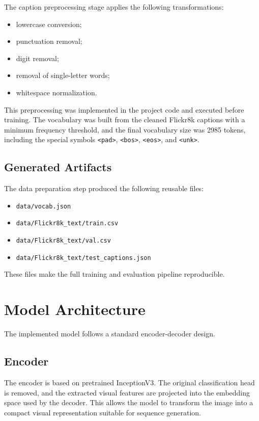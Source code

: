\documentclass[11pt,a4paper]{article}
\begin{document}
The caption preprocessing stage applies the following transformations:
\begin{itemize}[leftmargin=*]
    \item lowercase conversion;
    \item punctuation removal;
    \item digit removal;
    \item removal of single-letter words;
    \item whitespace normalization.
\end{itemize}

This preprocessing was implemented in the project code and executed before training. The vocabulary was built from the cleaned Flickr8k captions with a minimum frequency threshold, and the final vocabulary size was 2985 tokens, including the special symbols \texttt{<pad>}, \texttt{<bos>}, \texttt{<eos>}, and \texttt{<unk>}.

\subsection{Generated Artifacts}

The data preparation step produced the following reusable files:
\begin{itemize}[leftmargin=*]
    \item \texttt{data/vocab.json}
    \item \texttt{data/Flickr8k\_text/train.csv}
    \item \texttt{data/Flickr8k\_text/val.csv}
    \item \texttt{data/Flickr8k\_text/test\_captions.json}
\end{itemize}

These files make the full training and evaluation pipeline reproducible.

\section{Model Architecture}

The implemented model follows a standard encoder-decoder design.

\subsection{Encoder}

The encoder is based on pretrained InceptionV3. The original classification head is removed, and the extracted visual features are projected into the embedding space used by the decoder. This allows the model to transform the image into a compact visual representation suitable for sequence generation.
\end{document}
